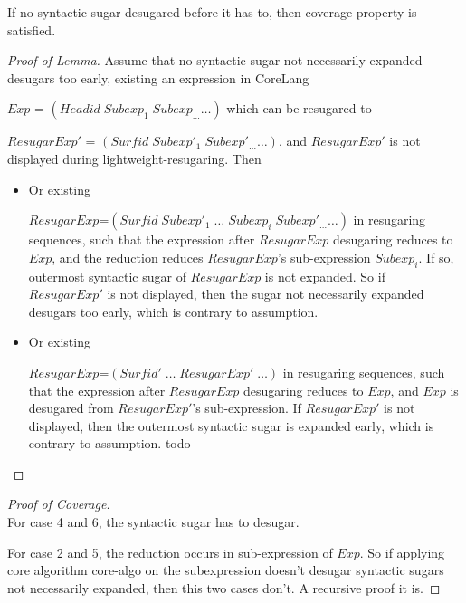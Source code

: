 \begin{lemma}
If no syntactic sugar desugared before it has to, then coverage property is satisfied.
\end{lemma}

\begin{proof}[Proof of Lemma]
Assume that no syntactic sugar not necessarily expanded desugars too early, existing an expression in CoreLang

$Exp$ = $(Headid\;Subexp_{1}\;Subexp_{\ldots} \ldots)$ which can be resugared to

$ResugarExp'$ = $(Surfid\;Subexp'_{1}\;Subexp'_{\ldots}\ldots)$, and $ResugarExp'$ is not displayed during lightweight-resugaring. Then

\begin{itemize}
	\item Or existing
	
	$ResugarExp$=$(Surfid\;Subexp'_{1}\;\ldots\;Subexp_{i}\;Subexp'_{\ldots}\ldots)$ in resugaring sequences, such that the expression after $ResugarExp$ desugaring reduces to $Exp$, and the reduction reduces $ResugarExp$'s sub-expression $Subexp_{i}$. If so, outermost syntactic sugar of $ResugarExp$ is not expanded. So if $ResugarExp'$ is not displayed, then the sugar not necessarily expanded desugars too early, which is contrary to assumption.
	
	
	\item Or existing
	
	$ResugarExp$=$(Surfid'\;\ldots\;ResugarExp'\;\ldots)$ in resugaring sequences, such that the expression after $ResugarExp$ desugaring reduces to $Exp$, and $Exp$ is desugared from $ResugarExp'$'s sub-expression. If $ResugarExp'$ is not displayed, then the outermost syntactic sugar is expanded early, which is contrary to assumption.
	todo

\end{itemize}
\end{proof}

\begin{proof}[Proof of Coverage]
\hfill\\
For case 4 and 6, the syntactic sugar has to desugar.

For case 2 and 5, the reduction occurs in sub-expression of $Exp$. So if applying core algorithm core-algo on the subexpression doesn't desugar syntactic sugars not necessarily expanded, then this two cases don't. A recursive proof it is.
\end{proof}

